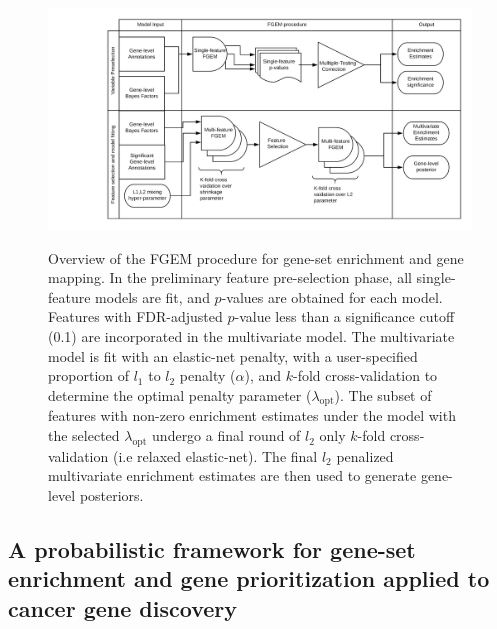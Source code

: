 \begin{figure}[h]
  \centering
  \includegraphics[width=.9\linewidth]{img/FGEM_procedure.png}\label{fig:overview}
  \caption{Overview of the FGEM procedure for gene-set enrichment and gene mapping.  In the preliminary feature pre-selection phase, all single-feature models are fit, and $p$-values are obtained for each model.
    Features with FDR-adjusted $p$-value less than a significance cutoff (0.1) are incorporated in the multivariate model. The multivariate model is fit with an elastic-net penalty, with a user-specified proportion of $l_1$
    to $l_2$ penalty ($\alpha$), and $k$-fold cross-validation to determine the optimal penalty parameter ($\lambda_{\text{opt}}$).  The subset of features with non-zero enrichment estimates under the model with the selected $\lambda_{\text{opt}}$ undergo a final round of $l_2$ only $k$-fold cross-validation (i.e relaxed elastic-net).  The final $l_2$ penalized multivariate enrichment estimates are then used to generate gene-level posteriors. }
\end{figure}


\subsection{A probabilistic framework for gene-set enrichment and gene prioritization applied to cancer gene discovery}\label{sec:org2d4ff20}

